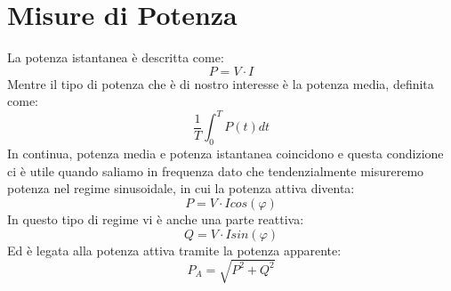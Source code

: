 \chapter{Misure di Potenza}
La potenza istantanea è descritta come:
\begin{equation*}
    P = V \cdot I
\end{equation*}
Mentre il tipo di potenza che è di nostro interesse è la potenza media, definita come:
\begin{equation*}
    \frac{1}{T} \int_0^T P(t) dt
\end{equation*}
In continua, potenza media e potenza istantanea coincidono e questa condizione ci è utile quando saliamo in frequenza dato che tendenzialmente misureremo potenza nel regime sinusoidale, in cui la potenza attiva diventa:
\begin{equation*}
    P = V \cdot I cos(\varphi)
\end{equation*}
In questo tipo di regime vi è anche una parte reattiva:
\begin{equation*}
    Q = V \cdot I sin(\varphi)
\end{equation*}
Ed è legata alla potenza attiva tramite la potenza apparente:
\begin{equation*}
    P_A = \sqrt{P^2 + Q^2}
\end{equation*}

